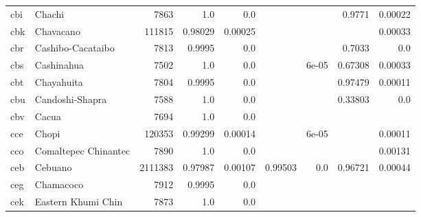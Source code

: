 \documentclass[11pt]{article}
\begin{document}
\begin{table*}[h]
{\begin{tabular}{llrrrrrrr}
cbi         & Chachi         & 7863         & 1.0         & 0.0         &          &          & 0.9771         & 0.00022         \\

cbk         & Chavacano         & 111815         & 0.98029         & 0.00025         &          &          &          & 0.00033         \\

cbr         & Cashibo-Cacataibo         & 7813         & 0.9995         & 0.0         &          &          & 0.7033         & 0.0         \\

cbs         & Cashinahua         & 7502         & 1.0         & 0.0         &          & 6e-05         & 0.67308         & 0.00033         \\

cbt         & Chayahuita         & 7804         & 0.9995         & 0.0         &          &          & 0.97479         & 0.00011         \\

cbu         & Candoshi-Shapra         & 7588         & 1.0         & 0.0         &          &          & 0.33803         & 0.0         \\

cbv         & Cacua         & 7694         & 1.0         & 0.0         &          &          &          &          \\

cce         & Chopi         & 120353         & 0.99299         & 0.00014         &          & 6e-05         &          & 0.00011         \\

cco         & Comaltepec Chinantec         & 7890         & 1.0         & 0.0         &          &          &          & 0.00131         \\

ceb         & Cebuano         & 2111383         & 0.97987         & 0.00107         & 0.99503         & 0.0         & 0.96721         & 0.00044         \\

ceg         & Chamacoco         & 7912         & 0.9995         & 0.0         &          &          &          &          \\

cek         & Eastern Khumi Chin         & 7873         & 1.0         & 0.0         &          &          &          &          \\


\end{tabular}}
\end{table*}
\end{document}
